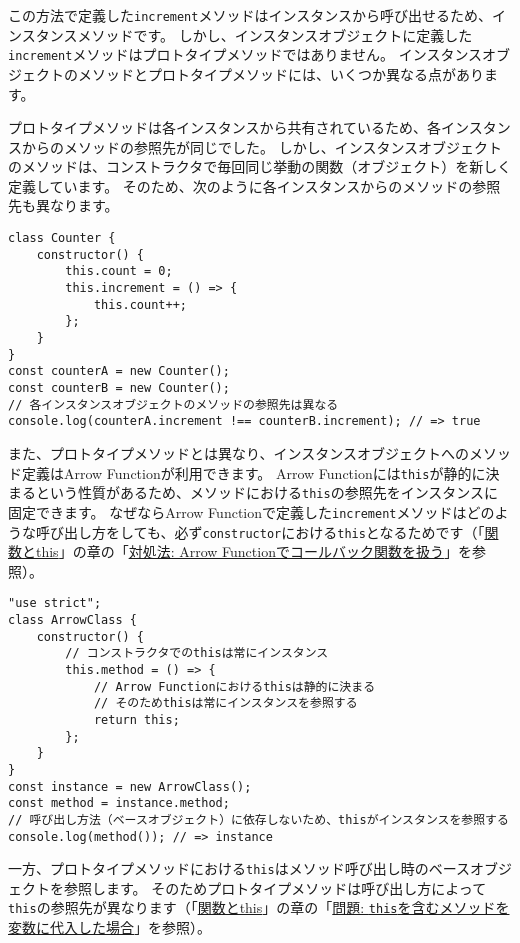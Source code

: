 この方法で定義した\texttt{increment}メソッドはインスタンスから呼び出せるため、インスタンスメソッドです。
しかし、インスタンスオブジェクトに定義した\texttt{increment}メソッドはプロトタイプメソッドではありません。
インスタンスオブジェクトのメソッドとプロトタイプメソッドには、いくつか異なる点があります。

プロトタイプメソッドは各インスタンスから共有されているため、各インスタンスからのメソッドの参照先が同じでした。
しかし、インスタンスオブジェクトのメソッドは、コンストラクタで毎回同じ挙動の関数（オブジェクト）を新しく定義しています。
そのため、次のように各インスタンスからのメソッドの参照先も異なります。

\begin{lstlisting}
class Counter {
    constructor() {
        this.count = 0;
        this.increment = () => {
            this.count++;
        };
    }
}
const counterA = new Counter();
const counterB = new Counter();
// 各インスタンスオブジェクトのメソッドの参照先は異なる
console.log(counterA.increment !== counterB.increment); // => true
\end{lstlisting}

また、プロトタイプメソッドとは異なり、インスタンスオブジェクトへのメソッド定義はArrow
Functionが利用できます。 Arrow
Functionには\texttt{this}が静的に決まるという性質があるため、メソッドにおける\texttt{this}の参照先をインスタンスに固定できます。
なぜならArrow
Functionで定義した\texttt{increment}メソッドはどのような呼び出し方をしても、必ず\texttt{constructor}における\texttt{this}となるためです（「\hyperlink{function-this}{関数とthis}」の章の「\hyperlink{arrow-function-callback}{対処法: Arrow
Functionでコールバック関数を扱う}」を参照）。

\begin{lstlisting}
"use strict";
class ArrowClass {
    constructor() {
        // コンストラクタでのthisは常にインスタンス
        this.method = () => {
            // Arrow Functionにおけるthisは静的に決まる
            // そのためthisは常にインスタンスを参照する
            return this;
        };
    }
}
const instance = new ArrowClass();
const method = instance.method;
// 呼び出し方法（ベースオブジェクト）に依存しないため、thisがインスタンスを参照する
console.log(method()); // => instance
\end{lstlisting}

一方、プロトタイプメソッドにおける\texttt{this}はメソッド呼び出し時のベースオブジェクトを参照します。
そのためプロトタイプメソッドは呼び出し方によって\texttt{this}の参照先が異なります（「\hyperlink{function-this}{関数とthis}」の章の「\hyperlink{assign-this-function}{問題:
\texttt{this}を含むメソッドを変数に代入した場合}」を参照）。

